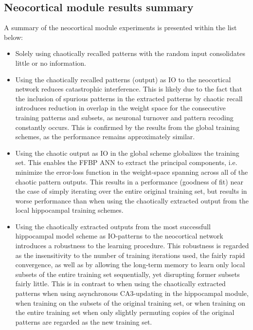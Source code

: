 \subsection{Neocortical module results summary}

A summary of the neocortical module experiments is presented within the list below:

\begin{itemize}
    \item Solely using chaotically recalled patterns with the random input consolidates little or no information.
    \item Using the chaotically recalled patterns (output) as IO to the neocortical network reduces catastrophic interference. This is likely due to the fact that the inclusion of spurious patterns in the extracted patterns by chaotic recall introduces reduction in overlap in the weight space for the consecutive training patterns and subsets, as neuronal turnover and pattern recoding constantly occurs. This is confirmed by the results from the global training schemes, as the performance remains approximately similar.
    \item Using the chaotic output as IO in the global scheme globalizes the training set. This enables the FFBP ANN to extract the principal components, i.e. minimize the error-loss function in the weight-space spanning across all of the chaotic pattern outputs. This results in a performance (goodness of fit) near the case of simply iterating over the entire original training set, but results in worse performance than when using the chaotically extracted output from the local hippocampal training schemes.
    \item Using the chaotically extracted outputs from the most successfull hippocampal model scheme as IO-patterns to the neocortical network introduces a robustness to the learning procedure. This robustness is regarded as the insensitivity to the number of training iterations used, the fairly rapid convergence, as well as by allowing the long-term memory to learn only local subsets of the entire training set sequentially, yet disrupting former subsets fairly little. This is in contrast to when using the chaotically extracted patterns when using asynchronous CA3-updating in the hippocampal module, when training on the subsets of the original training set, or when training on the entire training set when only slightly permuting copies of the original patterns are regarded as the new training set.
\end{itemize}

